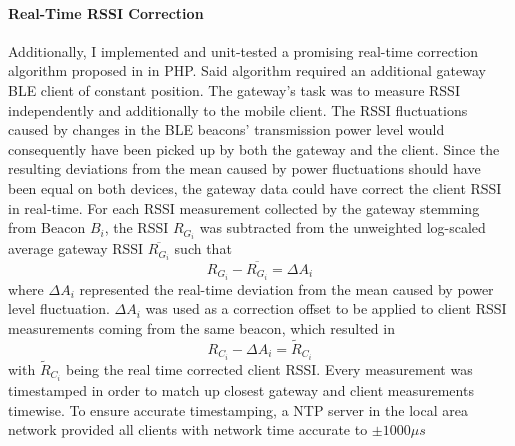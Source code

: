 \documentclass[a4paper, oneside]{ipsreport}
\begin{document}
\paragraph{Real-Time RSSI Correction}
Additionally, I implemented and unit-tested a promising real-time correction algorithm proposed in \cite{GatewayClient} in PHP. Said algorithm required an additional gateway BLE client of constant position. The gateway's task was to measure RSSI independently and additionally to the mobile client. The RSSI fluctuations caused by changes in the BLE beacons' transmission power level would consequently have been picked up by both the gateway and the client. Since the resulting deviations from the mean caused by power fluctuations should have been equal on both devices, the gateway data could have correct the client RSSI in real-time. For each RSSI measurement collected by the gateway stemming from Beacon $B_i$, the RSSI $R_{G_i}$ was subtracted from the unweighted log-scaled average gateway RSSI $\overline{R_{G_i}}$ such that
\begin{equation} \label{eq:gatewayClientBeacon}
	R_{G_i} - \overline{R_{G_i}} = \Delta A_i
\end{equation}
where $\Delta A_i$ represented the real-time deviation from the mean caused by power level fluctuation. $\Delta A_i$ was used as a correction offset to be applied to client RSSI measurements coming from the same beacon, which resulted in
\begin{equation} \label{eq:correctionOffset}
	R_{C_i} - \Delta A_i = \tilde{R}_{C_i}
\end{equation}
with $\tilde{R}_{C_i}$ being the real time corrected client RSSI. Every measurement was timestamped in order to match up closest gateway and client measurements timewise. To ensure accurate timestamping, a NTP server in the local area network provided all clients with network time accurate to $\pm 1000 \mu s$
\end{document}
